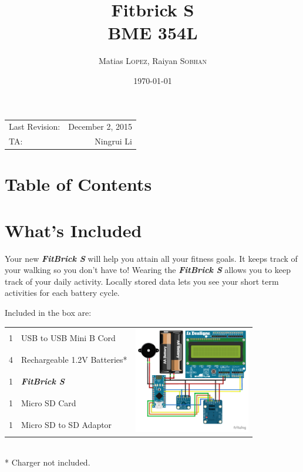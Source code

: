 \documentclass{article}
\title{Fitbrick S\\ BME 354L}
\author{Matias \textsc{Lopez}, Raiyan \textsc{Sobhan}}
\date{\today}
\begin{document}
\maketitle %

\begin{center}
\begin{tabular}{l r}
Last Revision: & December 2, 2015 \\
TA: & Ningrui Li %
\end{tabular}
\end{center}


\section*{Table of Contents}
\tableofcontents

\pagebreak

\section{What's Included}
Your new \textbf{\textit{FitBrick S}} will help you attain all your fitness goals. It keeps track of your walking so you don't have to!  Wearing the \textbf{\textit{FitBrick S}} allows you to keep track of your daily activity. Locally stored data lets you see your short term activities for each battery cycle. 

Included in the box are:\\
\begin{tabular}{l l c}
	1 & USB to USB Mini B Cord & \multirow{5}{*}{\includegraphics[width=2.0in]{sketch_bb}}\\
	4 & Rechargeable 1.2V Batteries* & ~\\
	1 & \textbf{\textit{FitBrick S}} & ~\\
	1 & Micro SD Card  & ~ \\
	1 & Micro SD to SD Adaptor & ~
\end{tabular}
\\
* Charger not included.
\end{document}
